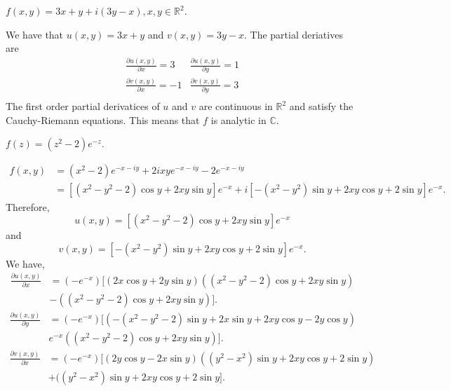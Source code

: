 \documentclass[12pt]{book}
\begin{document}
\begin{exmp}
    $f(x, y) = 3x + y + i(3y - x), x, y \in \mathbb{R}^{2}.$
\end{exmp}
We have that $u(x, y) = 3x + y$ and $v(x, y) = 3y - x.$ The partial deriatives are
\[
    \begin{array}{cc}
        \frac{\partial u(x, y)}{\partial x} = 3 & \frac{\partial u(x, y)}{\partial y} = 1 \\
        \frac{\partial v(x, y)}{\partial x} = -1 & \frac{\partial v(x, y)}{\partial y} = 3 \\
    \end{array}
\]
The first order partial derivatices of $u$ and $v$ are continuous in $\mathbb{R}^{2}$ and satisfy the Cauchy-Riemann equations. This means that $f$ is analytic in $\mathbb{C}.$

\begin{exmp}
    $f(z) = (z^2 - 2)e^{-z}.$
\end{exmp}
\begin{align*}
    f(x, y)
        &=
            (x^2 - 2)e^{-x - iy} + 2ixye^{-x - iy} - 2e^{-x - iy} \\
        &=
            [(x^2 - y^2 -2)\cos y + 2xy\sin y]e^{-x} + i[-(x^2 - y^2)\sin y + 2xy\cos y + 2\sin y]e^{-x}.
\end{align*} 
Therefore,
\[
    u(x, y) = [(x^2 - y^2 -2)\cos y + 2xy\sin y]e^{-x} 
\]
and
\[
    v(x, y) = [-(x^2 - y^2)\sin y + 2xy\cos y + 2\sin y]e^{-x}.
\]
We have,
\begin{equation*}
    \begin{split}
        \frac{\partial u(x, y)}{\partial x} 
            &= 
                (-e^{-x})[(2 x \cos y + 2 y \sin y)\left(\left(x^2 - y^2 - 2\right) \cos y + 2 x y\sin y \right) \\
            &- 
                \left(\left(x^2 - y^2 - 2\right) \cos y + 2xy\sin y\right)].
    \end{split}
\end{equation*}
\begin{equation*}
    \begin{split}
        \frac{\partial u(x, y)}{\partial y} 
            &= 
            (-e^{-x})[( -\left( x^2 - y^2 - 2 \right) \sin y + 2x\sin y + 2xy\cos y - 2y \cos y )\\
            &
                e^{-x}\left( \left(x^2 - y^2 - 2 \right) \cos y + 2xy\sin y \right)].
    \end{split}
\end{equation*}
\begin{equation*}
    \begin{split}
        \frac{\partial v(x, y)}{\partial x}
            &= 
                (-e^{-x}) [(2y\cos y - 2x\sin y)((y^2 - x^2)\sin y + 2xy \cos y + 2\sin y) \\
            &+ 
                ((y^2 - x^2)\sin y + 2xy\cos y + 2 \sin y].
    \end{split}
\end{equation*}
\end{document}
